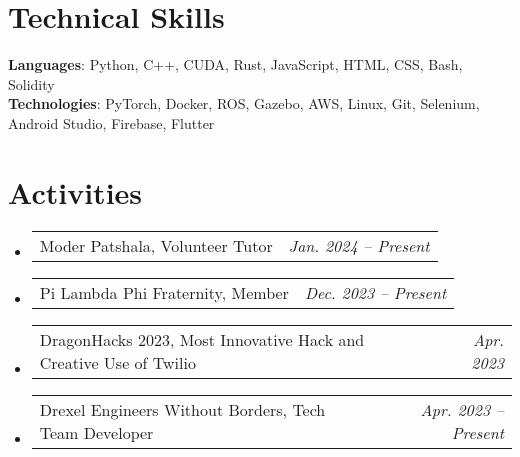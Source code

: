 \documentclass[letterpaper,11pt]{article}
\makeatletter
\newcommand{\resumeSubSubheading}[2]{
    \item
    \begin{tabular*}{0.97\textwidth}{l@{\extracolsep{\fill}}r}
      \small#1 & \textit{\small#2} \\
    \end{tabular*}\vspace{-7pt}
}
\newcommand{\resumeSubHeadingListStart}{\begin{itemize}[leftmargin=0.15in, label={}]}
\newcommand{\resumeSubHeadingListEnd}{\end{itemize}}
\makeatother
\begin{document}
%
\section{Technical Skills}
 \begin{itemize}[leftmargin=0.15in, label={}]
    \small{\item{
     \textbf{Languages}{: Python, C++, CUDA, Rust, JavaScript, HTML, CSS, Bash, Solidity} \\
     \textbf{Technologies}{: PyTorch, Docker, ROS, Gazebo, AWS, Linux, Git, Selenium, Android Studio, Firebase, Flutter} \\
    }}
 \end{itemize}


\section{Activities}
\vspace{-5pt} %
\resumeSubHeadingListStart
    \resumeSubSubheading{Moder Patshala, Volunteer Tutor}{\textit{Jan. 2024 -- Present}}
    \resumeSubSubheading{Pi Lambda Phi Fraternity, Member}{\textit{Dec. 2023 -- Present}}
    \resumeSubSubheading{DragonHacks 2023, Most Innovative Hack and Creative Use of Twilio}{\textit{Apr. 2023}}
    \resumeSubSubheading{Drexel Engineers Without Borders, Tech Team Developer}{\textit{Apr. 2023 -- Present}}
\resumeSubHeadingListEnd



\end{document}
